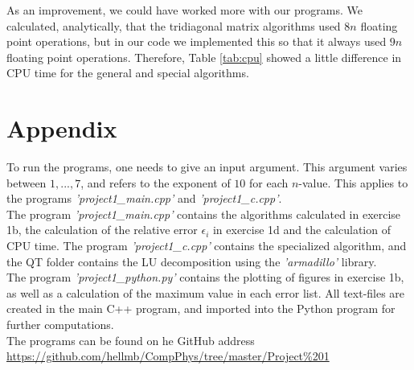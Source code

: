 \documentclass[12pt]{article}
\begin{document}
\noindent As an improvement, we could have worked more with our programs. We calculated, analytically, that the tridiagonal matrix algorithms used $8n$ floating point operations, but in our code we implemented this so that it always used $9n$ floating point operations. Therefore, Table \ref{tab:cpu} showed a little difference in CPU time for the general and special algorithms.  



\section{Appendix}

\noindent To run the programs, one needs to give an input argument. This argument varies between $1,...,7$, and refers to the exponent of $10$ for each $n$-value. This applies to the programs \textit{'project1\_main.cpp'} and \textit{'project1\_c.cpp'}. \\

\noindent The program \textit{'project1\_main.cpp'} contains the algorithms calculated in exercise 1b, the calculation of the relative error $\epsilon_i$ in exercise 1d and the calculation of CPU time. The program \textit{'project1\_c.cpp'} contains the specialized algorithm, and the QT folder contains the LU decomposition using the \textit{'armadillo'} library. \\

\noindent The program \textit{'project1\_python.py'} contains the plotting of figures in exercise 1b, as well as a calculation of the maximum value in each error list. All text-files are created in the main C++ program, and imported into the Python program for further computations. \\

\noindent The programs can be found on he GitHub address \url{https://github.com/hellmb/CompPhys/tree/master/Project%201}


\nocite{*}


\end{document}
